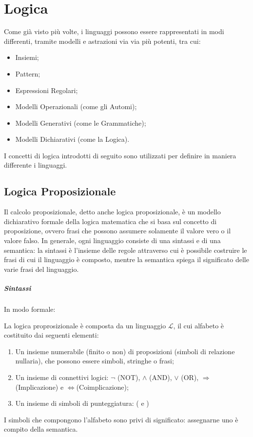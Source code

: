 \chapter{Logica}
Come già visto più volte, i linguaggi possono essere rappresentati in modi differenti, tramite modelli e astrazioni via via più potenti, tra cui:
\begin{itemize}
  \item Insiemi;
  \item Pattern;
  \item Espressioni Regolari;
  \item Modelli Operazionali (come gli Automi);
  \item Modelli Generativi (come le Grammatiche);
  \item Modelli Dichiarativi (come la Logica).
\end{itemize}

\noindent
I concetti di logica introdotti di seguito sono utilizzati per definire in maniera differente i linguaggi.

\section{Logica Proposizionale}
Il calcolo proposizionale, detto anche logica proposizionale, è un modello dichiarativo formale della logica matematica che si basa sul concetto di proposizione, ovvero frasi che possono assumere solamente il valore vero o il valore falso. In generale, ogni linguaggio consiste di una sintassi e di una semantica: la sintassi è l'insieme delle regole attraverso cui è possibile costruire le frasi di cui il linguaggio è composto, mentre la semantica spiega il significato delle varie frasi del linguaggio. 

\paragraph*{Sintassi}
In modo formale:
\begin{definition}
  La logica proprosizionale è composta da un linguaggio \(\mathcal L\), il cui alfabeto è costituito dai seguenti elementi:
  \begin{enumerate}
    \item Un insieme numerabile (finito o non) di proposizioni (simboli di relazione nullaria), che possono essere simboli, stringhe o frasi;
    \item Un insieme di connettivi logici: \(\lnot\) (NOT), \(\wedge\) (AND), \(\vee\) (OR), \(\Rightarrow\) (Implicazione) e \(\Leftrightarrow \)(Coimplicazione);
    \item Un insieme di simboli di punteggiatura: ( e )
  \end{enumerate}
  I simboli che compongono l'alfabeto sono privi di significato: assegnarne uno è compito della semantica. 
\end{definition}

